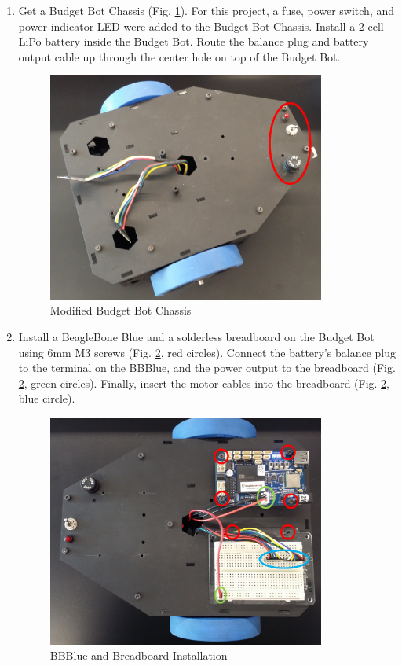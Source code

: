 \begin{enumerate}[label = \textbf{Step \arabic*.}]
    \item Get a Budget Bot Chassis (Fig. \ref{fig:assemblyBudgetBot}). For this project, a fuse, power switch, and power indicator LED were added to the Budget Bot Chassis. Install a 2-cell LiPo battery inside the Budget Bot. Route the balance plug and battery output cable up through the center hole on top of the Budget Bot.
    \begin{figure}[H]
        \centering
        \includegraphics[width=3.6in]{figs/img/assembly/01-BudgetBot.png}
        \caption{Modified Budget Bot Chassis}
        \label{fig:assemblyBudgetBot}
    \end{figure}

    \item Install a BeagleBone Blue and a solderless breadboard on the Budget Bot using 6mm M3 screws (Fig. \ref{fig:bbblueInstallation}, red circles). Connect the battery's balance plug to the terminal on the BBBlue, and the power output to the breadboard (Fig. \ref{fig:bbblueInstallation}, green circles). Finally, insert the motor cables into the breadboard (Fig. \ref{fig:bbblueInstallation}, blue circle).
    \begin{figure}[H]
        \centering
        \includegraphics[width=3.6in]{figs/img/assembly/02-bbblueInstallation.png}
        \caption{BBBlue and Breadboard Installation}
        \label{fig:bbblueInstallation}
    \end{figure}


\end{enumerate}
